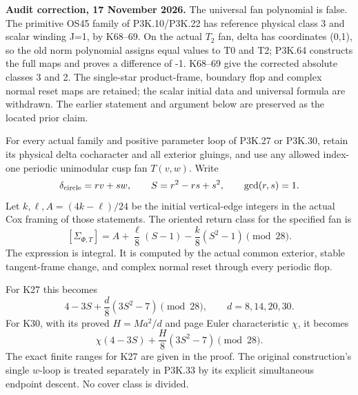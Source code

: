 \begin{theorem}\label{night:P3K.31}
\par\noindent\textbf{Audit correction, 17 November 2026.} The universal fan polynomial is false. The primitive OS45 family of P3K.10/P3K.22 has reference physical class 3 and scalar winding J=1, by K68--69. On the actual \(T_2\) fan, delta has coordinates (0,1), so the old norm polynomial assigns equal values to T0 and T2; P3K.64 constructs the full maps and proves a difference of -1. K68--69 give the corrected absolute classes 3 and 2. The single-star product-frame, boundary flop and complex normal reset maps are retained; the scalar initial data and universal formula are withdrawn. The earlier statement and argument below are preserved as the located prior claim.
\medskip

For every actual family and positive parameter loop of P3K.27 or
P3K.30, retain its physical delta cocharacter and all exterior
gluings, and use any allowed index-one periodic unimodular cusp
fan \(T(v,w)\). Write
\[
 \delta_{\rm circle}=r v+s w,\qquad
 S=r^2-rs+s^2,\qquad \gcd(r,s)=1.
\]
Let \(k,\ell,A=(4k-\ell)/24\) be the initial vertical-edge
integers in the actual Cox framing of those statements.
The oriented return class for the specified fan is
\[
 [\Sigma_{\Phi,T}]
    =A+\frac{\ell}{8}(S-1)-\frac{k}{8}(S^2-1)
        \pmod{28}.                                      \tag{P3K.31.0}
\]
The expression is integral. It is computed by the actual common
exterior, stable tangent-frame change, and complex normal reset
through every periodic flop.

For K27 this becomes
\[
           4-3S+\frac d8(3S^2-7)\pmod{28},
       \qquad d=8,14,20,30.
\]
For K30, with its proved \(H=Ma^2/d\) and page Euler characteristic
\(\chi\), it becomes
\[
                 \chi(4-3S)+\frac H8(3S^2-7)\pmod{28}.
\]
The exact finite ranges for K27 are given in the proof.
 The original construction's single \(w\)-loop is treated separately
 in P3K.33 by its explicit simultaneous endpoint descent. No cover
 class is divided.
\end{theorem}
